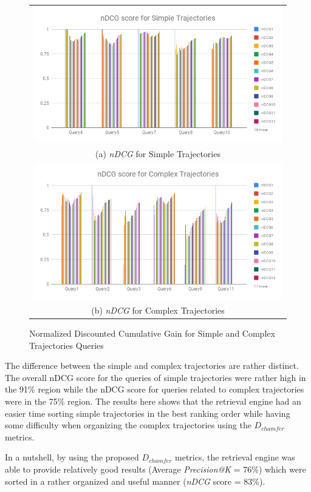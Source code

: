 \begin{figure}[htb!]
  \centering
\begin{tabular}{c}
 \includegraphics[width=0.9\linewidth]{image/retrievalTwo/ndcgSimple.png}\\
 (a) \textit{nDCG} for Simple Trajectories \\
 \includegraphics[width=0.9\linewidth]{image/retrievalTwo/ndcgComplex.png} \\
 (b) \textit{nDCG} for Complex Trajectories
\end{tabular}
\caption{Normalized Discounted Cumulative Gain for Simple and Complex Trajectories Queries} \label{fig:versionTwoNDCG}
\end{figure}

The difference between the simple and complex trajectories are rather distinct. The overall nDCG score for the queries of simple trajectories were rather high in the 91\% region while the nDCG score for queries related to complex trajectories were in the 75\% region. The results here shows that the retrieval engine had an easier time sorting simple trajectories in the best ranking order while having some difficulty when organizing the complex trajectories using the $D_{chamfer}$ metrics. 

In a nutshell, by using the proposed $D_{chamfer}$ metrics, the retrieval engine was able to provide relatively good results (Average \textit{Precision@K} = 76\%) which were sorted in a rather organized and useful manner (\textit{nDCG} score = 83\%).

